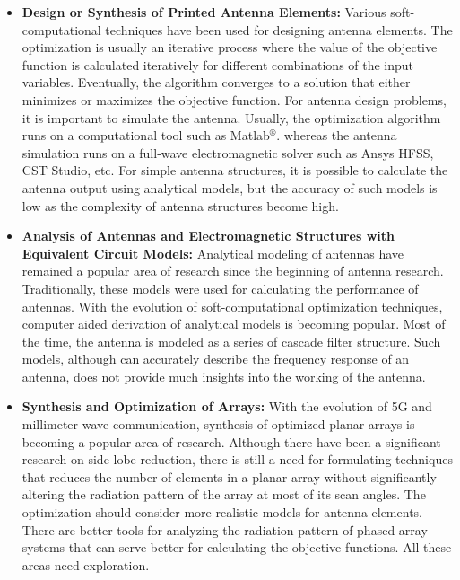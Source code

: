 \begin{itemize}
\item \textbf{Design or Synthesis of Printed Antenna Elements:} Various soft-computational techniques have been used for designing antenna elements. The optimization is usually an iterative process where the value of the objective function is calculated iteratively for different combinations of the input variables. Eventually, the algorithm converges to a solution that either minimizes or maximizes the objective function. For antenna design problems, it is important to simulate the antenna. Usually, the optimization algorithm runs on a computational tool such as Matlab$^{\circledR}$. whereas the antenna simulation runs on a full-wave electromagnetic solver such as Ansys HFSS, CST Studio, etc. For simple antenna structures, it is possible to calculate the antenna output using analytical models, but the accuracy of such models is low as the complexity of antenna structures become high.
\item \textbf{Analysis of Antennas and Electromagnetic Structures with Equivalent Circuit Models:} Analytical modeling of antennas have remained a popular area of research since the beginning of antenna research. Traditionally, these models were used for calculating the performance of antennas. With the evolution of soft-computational optimization techniques, computer aided derivation of analytical models is becoming popular. Most of the time, the antenna is modeled as a series of cascade filter structure. Such models, although can accurately describe the frequency response of an antenna, does not provide much insights into the working of the antenna.
\item \textbf{Synthesis and Optimization of Arrays:} With the evolution of 5G and millimeter wave communication, synthesis of optimized planar arrays is becoming a popular area of research. Although there have been a significant research on side lobe reduction, there is still a need for formulating techniques that reduces the number of elements in a planar array without significantly altering the radiation pattern of the array at most of its scan angles. The optimization should consider more realistic models for antenna elements. There are better tools for analyzing the radiation pattern of phased array systems that can serve better for calculating the objective functions. All these areas need exploration.
\end{itemize}


